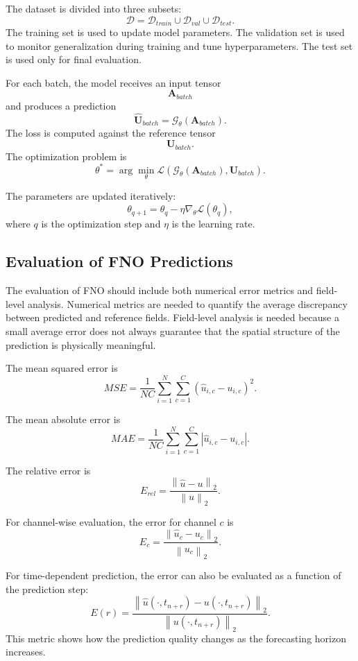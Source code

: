 \documentclass[14pt]{extarticle}
\begin{document}
The dataset is divided into three subsets:
\[
\mathcal{D}
=
\mathcal{D}_{train}
\cup
\mathcal{D}_{val}
\cup
\mathcal{D}_{test}.
\]
The training set is used to update model parameters. The validation set is used to monitor generalization during training and tune hyperparameters. The test set is used only for final evaluation.

For each batch, the model receives an input tensor
\[
\mathbf{A}_{batch}
\]
and produces a prediction
\[
\hat{\mathbf{U}}_{batch}
=
\mathcal{G}_{\theta}
\left(
\mathbf{A}_{batch}
\right).
\]
The loss is computed against the reference tensor
\[
\mathbf{U}_{batch}.
\]
The optimization problem is
\[
\theta^{*}
=
\arg\min_{\theta}
\mathcal{L}
\left(
\mathcal{G}_{\theta}(\mathbf{A}_{batch}),
\mathbf{U}_{batch}
\right).
\]

The parameters are updated iteratively:
\[
\theta_{q+1}
=
\theta_q
-
\eta
\nabla_{\theta}
\mathcal{L}(\theta_q),
\]
where \(q\) is the optimization step and \(\eta\) is the learning rate.

\subsection{Evaluation of FNO Predictions}

The evaluation of FNO should include both numerical error metrics and field-level analysis. Numerical metrics are needed to quantify the average discrepancy between predicted and reference fields. Field-level analysis is needed because a small average error does not always guarantee that the spatial structure of the prediction is physically meaningful.

The mean squared error is
\[
MSE
=
\frac{1}{NC}
\sum_{i=1}^{N}
\sum_{c=1}^{C}
\left(
\hat{u}_{i,c}
-
u_{i,c}
\right)^2.
\]

The mean absolute error is
\[
MAE
=
\frac{1}{NC}
\sum_{i=1}^{N}
\sum_{c=1}^{C}
\left|
\hat{u}_{i,c}
-
u_{i,c}
\right|.
\]

The relative error is
\[
E_{rel}
=
\frac{
\left\|
\hat{u} - u
\right\|_2
}{
\left\|
u
\right\|_2
}.
\]

For channel-wise evaluation, the error for channel \(c\) is
\[
E_c
=
\frac{
\left\|
\hat{u}_{c} - u_{c}
\right\|_2
}{
\left\|
u_{c}
\right\|_2
}.
\]

For time-dependent prediction, the error can also be evaluated as a function of the prediction step:
\[
E(r)
=
\frac{
\left\|
\hat{u}(\cdot, t_{n+r})
-
u(\cdot, t_{n+r})
\right\|_2
}{
\left\|
u(\cdot, t_{n+r})
\right\|_2
}.
\]
This metric shows how the prediction quality changes as the forecasting horizon increases.
\end{document}
